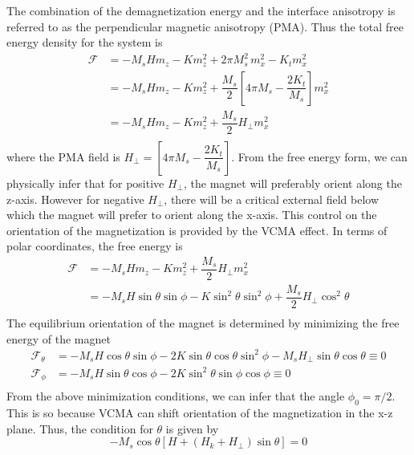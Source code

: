 \documentclass[aps,prb,onecolumn,notitlepage,showpacs,floatfix,superscriptaddress]{revtex4-1}
\newcommand{\sint}{\sin\theta}
\newcommand{\cost}{\cos\theta}
\newcommand{\sinp}{\sin \phi}
\newcommand{\cosp}{ \cos\phi}
\newcommand{\fe}{ \mathcal{F}}
\begin{document}
The combination of the demagnetization energy and the interface anisotropy is referred to as the perpendicular magnetic anisotropy (PMA). Thus the total free energy density for the system is
\begin{equation}
\begin{split}
\fe  &=  - M_s H m_z - K m_z^2 + 2\pi M_s^2 \, m_x^2 - K_t m_x^2 \\
&=  - M_s H m_z - K m_z^2 +\dfrac{M_s}{2} \left[  4\pi M_s - \dfrac{2 K_t}{M_s} \right] m_x^2 \\
&=  - M_s H m_z - K m_z^2 +\dfrac{M_s}{2} H_{\perp} m_x^2 \\
\end{split}
\end{equation}
where the PMA field is $H_\perp = \left[  4\pi M_s - \dfrac{2 K_t}{M_s} \right]$. From the free energy form, we can physically infer that for positive $H_\perp$, the magnet will preferably orient along the z-axis. However for negative $H_\perp$, there will be a critical external field below which the magnet will prefer to orient along the x-axis. This control on the orientation of the magnetization is provided by the VCMA effect. In terms of polar coordinates, the free energy is
\begin{equation}
\begin{split}
\fe  &=  - M_s H m_z - K m_z^2 +\dfrac{M_s}{2} H_{\perp} m_x^2 \\
&=  - M_s H \sint \sinp - K \sin^2 \theta \sin^2 \phi +\dfrac{M_s}{2} H_{\perp} \cos^2 \theta \\
\end{split}
\end{equation}
The equilibrium orientation of the magnet is determined by minimizing the free energy of the magnet
\begin{equation}
\begin{split}
\fe_\theta  &=  - M_s H \cost \sinp - 2 K \sint \cost \sin^2 \phi -M_s H_{\perp} \sint \cost \equiv 0 \\
\fe_\phi  &=  - M_s H \sint \cosp - 2 K \sin^2 \theta \sinp \cosp \equiv 0 \\
\end{split}
\end{equation}
From the above minimization conditions, we can infer that the angle $\phi_0 = \pi/2$. This is so because VCMA can shift orientation of the magnetization in the x-z plane. Thus, the condition for $\theta$ is given by
\begin{equation}
- M_s \cost \left[ H   + \left(H_k+ H_{\perp}\right) \sint \right] = 0
\end{equation}
\end{document}
